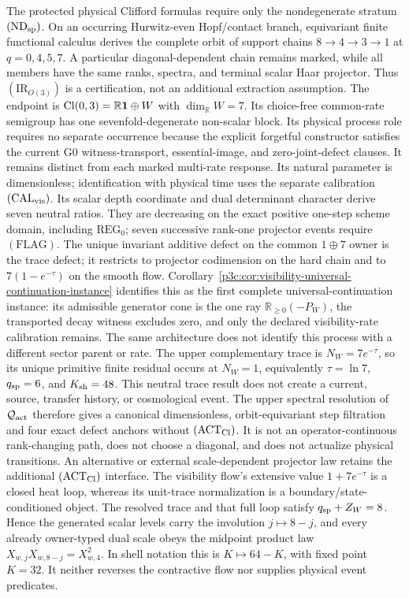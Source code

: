 \documentclass[12pt,a4paper]{article}
\begin{document}
The protected physical Clifford formulas require only the nondegenerate
stratum \((\mathrm{ND}_{\rm sp})\).  On an occurring Hurwitz-even
Hopf/contact branch, equivariant finite functional calculus derives the
complete orbit of support chains \(8\to4\to3\to1\) at \(q=0,4,5,7\).
A particular diagonal-dependent chain remains marked, while all members have
the same ranks, spectra, and terminal scalar Haar projector.  Thus
\((\mathrm{IR}_{O(3)})\) is a certification, not
an additional extraction assumption.  The endpoint is
\(\operatorname{Cl}(0,3)=\mathbb R\mathbf1\oplus W\) with \(\dim_{\mathbb R}W=7\).  Its
choice-free common-rate semigroup has one sevenfold-degenerate non-scalar
block.  Its physical process role requires no separate occurrence because the
explicit forgetful constructor satisfies the current G0 witness-transport,
essential-image, and zero-joint-defect clauses.  It remains distinct from each
marked multi-rate response.  Its natural parameter is dimensionless;
identification with physical time uses the separate calibration
\((\mathrm{CAL}_{\rm vis})\).  Its scalar depth coordinate and dual
determinant character derive seven neutral ratios.  They are decreasing on
the exact positive one-step scheme domain, including \(\mathrm{REG}_0\);
seven successive rank-one projector events require
\((\mathrm{FLAG})\).  The unique invariant additive defect on the common
\(1\oplus7\) owner is the trace defect; it restricts to projector codimension
on the hard chain and to \(7(1-e^{-\tau})\) on the smooth flow.
Corollary~\ref{p3c:cor:visibility-universal-continuation-instance} identifies
this as the first complete universal-continuation instance: its admissible
generator cone is the one ray \(\mathbb R_{\ge0}(-P_W)\), the transported
decay witness excludes zero, and only the declared visibility-rate
calibration remains.  The same architecture does not identify this process
with a different sector parent or rate.
The upper
complementary trace is \(N_W=7e^{-\tau}\), so its unique primitive finite
residual occurs at \(N_W=1\), equivalently
\(\tau=\ln7\), \(q_{\rm sp}=6\), and \(K_{\mathrm{sh}}=48\).  This neutral trace result
does not create a current, source, transfer history, or cosmological event.
The upper
spectral resolution of \(\mathcal Q_{\rm act}\) therefore gives a canonical
dimensionless, orbit-equivariant step filtration and four exact defect
anchors without \((\mathrm{ACT}_{\rm Cl})\).  It is not an
operator-continuous rank-changing path, does not choose a diagonal, and does
not actualize physical transitions.  An alternative or external
scale-dependent projector law retains the additional
\((\mathrm{ACT}_{\rm Cl})\) interface.  The visibility flow's extensive value
\(1+7e^{-\tau}\) is a closed heat loop, whereas its unit-trace normalization
is a boundary/state-conditioned object.
The resolved trace and that full loop satisfy
\(q_{\rm sp}+Z_W=8\).  Hence the generated scalar levels carry the involution
\(j\mapsto8-j\), and every already owner-typed dual scale obeys the midpoint
product law \(X_{w,j}X_{w,8-j}=X_{w,4}^2\).  In shell notation this is
\(K\mapsto64-K\), with fixed point \(K=32\).  It neither reverses the
contractive flow nor supplies physical event predicates.
\end{document}
